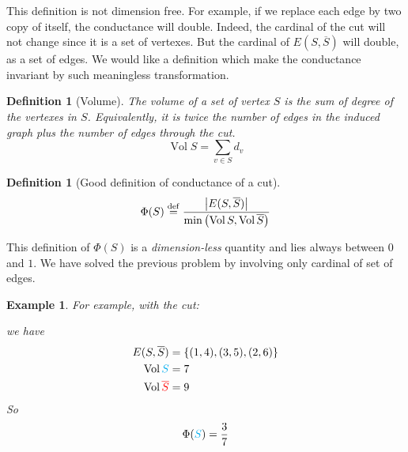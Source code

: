 \documentclass[12pt]{article}
\newtheorem{definition}[lemma]{Definition}
\newtheorem{example}[lemma]{Example}
\newcommand{\defeq}{\stackrel{{\rm def}}{=}}
\newcommand{\set}[1]{\left\{ #1 \right\}}
\newcommand{\card}[1]{\left\lvert#1\right\rvert}
\DeclareMathOperator{\vol}{Vol}
\begin{document}
This definition is not dimension free. For example, if we replace each edge by two copy of itself, the conductance will double. Indeed, the cardinal of the cut will not change since it is a set of vertexes. But the cardinal of $E(S,\overline{S})$ will double, as a set of edges. We would like a definition which make the conductance invariant by such meaningless transformation.

\begin{definition}[Volume]
    The volume of a set of vertex $S$ is the sum of degree of the vertexes in $S$. Equivalently, it is twice the number of edges in the induced graph plus the number of edges through the cut.
    \[
        \vol S = \sum\limits_{v\in S}d_v
    \]
\end{definition}

   
\begin{definition}[Good definition of conductance of a cut]
    \[
        \Phi(S) \defeq \frac{\card{E(S,\overline{S})}}{\min\left(\vol S,\vol \overline{S}\right)}
    \]
\end{definition}

This definition of $\Phi(S)$ is a \emph{dimension-less} quantity and lies always between $0$ and $1$. We have solved the previous problem by involving only cardinal of set of edges.

\begin{example}
    For example, with the cut:
    \begin{figure}[!ht]
        \centering
    \end{figure}
    \FloatBarrier
    \noindent    
    we have
    \[
        \begin{aligned}
            E(S,\overline{S}) &= \set{(1,4),(3,5), (2,6)}\\
            \vol \textcolor{cyan}{S} &= 7\\
            \vol \textcolor{red}{\overline{S}} &= 9
        \end{aligned}
    \]
    So
    \[
        \Phi(\textcolor{cyan}{S}) = \frac{3}{7}
    \]
\end{example}
\end{document}
